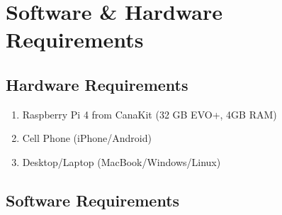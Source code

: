 \section{Software \& Hardware Requirements}	\label{sec:setup}
	\subsection{Hardware Requirements}	\label{subsec:hardware}
		\begin{enumerate}
			\item Raspberry Pi 4 from CanaKit (32 GB EVO+, 4GB RAM)
			\item Cell Phone (iPhone/Android)
			\item Desktop/Laptop (MacBook/Windows/Linux)
		\end{enumerate}
	\subsection{Software Requirements}	\label{subsec:software}
